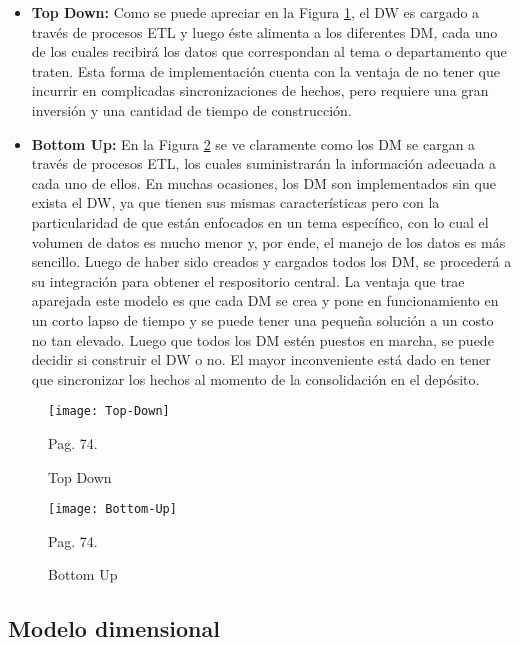 \documentclass[a4paper,11pt]{article}
\begin{document}
    \begin{itemize}
      \item \textbf{Top Down:} Como se puede apreciar en la Figura \ref{top_down}, el DW es cargado a través de procesos ETL y luego éste alimenta a los
      diferentes DM, cada uno de los cuales recibirá los datos que correspondan al tema o departamento que traten. Esta forma de implementación cuenta
      con la ventaja de no tener que incurrir en complicadas sincronizaciones de hechos, pero requiere una gran inversión y una cantidad de tiempo de
      construcción.
      \item \textbf{Bottom Up:} En la Figura \ref{bottom_up} se ve claramente como los DM se cargan a través de procesos ETL, los cuales suministrarán la
      información adecuada a cada uno de ellos. En muchas ocasiones, los DM son implementados sin que exista el DW, ya que tienen sus mismas 
      características pero con la particularidad de que están enfocados en un tema específico, con lo cual el volumen de datos es mucho menor y, por ende,
      el manejo de los datos es más sencillo. Luego de haber sido creados y cargados todos los DM, se procederá a su integración para obtener el
      respositorio central. La ventaja que trae aparejada este modelo es que cada DM se crea y pone en funcionamiento en un corto lapso de tiempo y se
      puede tener una pequeña solución a un costo no tan elevado. Luego que todos los DM estén puestos en marcha, se puede decidir si construir el DW o no.
      El mayor inconveniente está dado en tener que sincronizar los hechos al momento de la consolidación en el depósito.
    \end{itemize}
    
    \begin{figure}
      \begin{center}
        \texttt{[image: Top-Down]}
        \caption{Top Down} \cite{hefestov2} Pag. 74.
        \label{top_down}
      \end{center}
    \end{figure}
    
    \begin{figure}
      \begin{center}
        \texttt{[image: Bottom-Up]}
        \caption{Bottom Up} \cite{hefestov2} Pag. 74.
        \label{bottom_up}
      \end{center}
    \end{figure}
    
    
    \subsection{Modelo dimensional}
    
\end{document}

